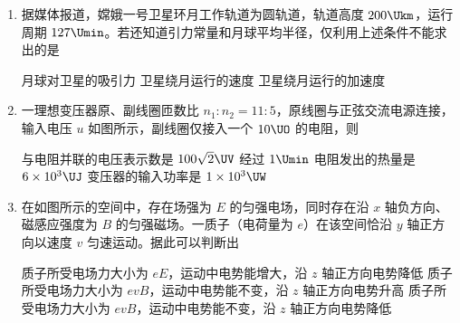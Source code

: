 \documentclass[\gkver]{gaokaozhenti}
\begin{document}
\begin{enumerate}
{波长是 $0.5\Um$}
{波速是 $2\Ums$}
{经 $1.6\Us$ 传播了 $8\Um$}


\item
据媒体报道，嫦娥一号卫星环月工作轨道为圆轨道，轨道高度 $200\Ukm$，运行周期 $127\Umin$。若还知道引力常量和月球平均半径，仅利用上述条件不能求出的是

{月球对卫星的吸引力}
{卫星绕月运行的速度}
{卫星绕月运行的加速度}


\item
一理想变压器原、副线圈匝数比 $n_{1}:n_{2}=11:5$，原线圈与正弦交流电源连接，输入电压 $u$ 如图所示，副线圈仅接入一个 $10\UO$ 的电阻，则


{与电阻并联的电压表示数是 $100\sqrt{2}\UV$}
{经过 $1\Umin$ 电阻发出的热量是 $6\times10^{3}\UJ$}
{变压器的输入功率是 $1\times10^{3}\UW$}


\item
在如图所示的空间中，存在场强为 $E$ 的匀强电场，同时存在沿 $x$ 轴负方向、磁感应强度为 $B$ 的匀强磁场。一质子（电荷量为 $e$）在该空间恰沿 $y$ 轴正方向以速度 $v$ 匀速运动。据此可以判断出


{质子所受电场力大小为 $eE$，运动中电势能增大，沿 $z$ 轴正方向电势降低}
{质子所受电场力大小为 $evB$，运动中电势能不变，沿 $z$ 轴正方向电势升高}
{质子所受电场力大小为 $evB$，运动中电势能不变，沿 $z$ 轴正方向电势降低}


\end{enumerate}
\end{document}
